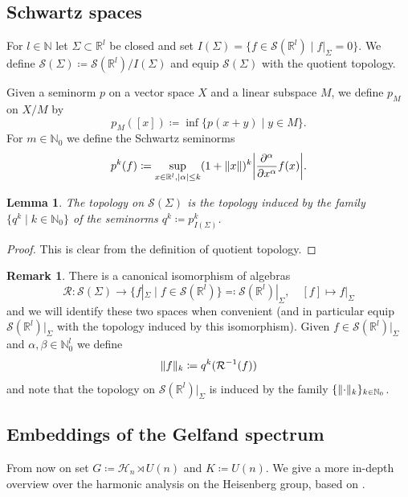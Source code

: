 \documentclass[12pt,reqno,a4paper]{amsart}
\theoremstyle{theorem}
\newtheorem{lemma}[theorem]{Lemma}
\theoremstyle{definition}
\newtheorem{remark}[theorem]{Remark}
\numberwithin{theorem}{section}
\numberwithin{equation}{section}
\newcommand{\R}{\mathbb{R}}
\newcommand{\N}{\mathbb{N}}
\DeclarePairedDelimiter{\norm}{\lVert}{\rVert}
\DeclarePairedDelimiter{\abs}{\lvert}{\rvert}
\begin{document}
\subsection{Schwartz spaces}
For $l\in \N$ let $\Sigma\subset \R^l$ be closed and set $I(\Sigma)=\{f\in\mathscr{S}(\R^l)\mid f|_\Sigma = 0\}$. 
We define $\mathscr{S}(\Sigma)\coloneqq \mathscr{S}(\R^l)/I(\Sigma)$ and equip $\mathscr{S}(\Sigma)$ with the quotient topology.

Given a seminorm $p$ on a vector space $X$ and a linear subspace $M$, we define $p_M$ on $X/M$ by 
\[
p_M([x])\coloneqq \inf \{p(x+y)\mid y\in M\}.
\]
For $m\in\N_0$ we define the Schwartz seminorms 
\[
p^{k}(f)\coloneqq \sup_{x\in \R^l, \abs{\alpha}\leq k} (1+\norm{x})^k\abs*{\frac{\partial^\alpha}{\partial x^\alpha}f(x)}.
\]

\begin{lemma}
	The topology on $\mathscr{S}(\Sigma)$ is the topology induced by the family $\{q^{k}\mid k\in \N_0\}$ of the seminorms $q^{k}\coloneqq p^{k}_{I(\Sigma)}$.
\end{lemma}
\begin{proof}
	This is clear from the definition of quotient topology.
\end{proof}

\begin{remark}
	There is a canonical isomorphism of algebras
	\[
	\mathcal{R}:\mathscr{S}(\Sigma)\to \{f|_\Sigma \mid f\in \mathscr{S}(\R^l)\}\eqqcolon \mathscr{S}(\R^l)|_{\Sigma},\quad [f]\mapsto f|_\Sigma
	\]
	and we will identify these two spaces when convenient (and in particular equip $\mathscr{S}(\R^l)|_{\Sigma}$ with the topology induced by this isomorphism).
	Given $f\in \mathscr{S}(\R^l)|_{\Sigma}$ and $\alpha,\beta\in \N_0^l$ we define
	\[
	\norm{f}_{k}\coloneqq q^{k}(\mathcal{R}^{-1}(f))
	\]
	and note that the topology on $\mathscr{S}(\R^l)|_{\Sigma}$ is induced by the family
	$\{\norm{\cdot}_{k}\}_{k\in \N_0}$.
\end{remark}
\subsection{Embeddings of the Gelfand spectrum}
From now on set $G\coloneqq \mathcal{H}_n\rtimes U(n)$ and $K\coloneqq U(n)$.
We give a more in-depth overview over the harmonic analysis on the Heisenberg group, based on \cite{AdBRSphericalSchwartz}.
\end{document}

